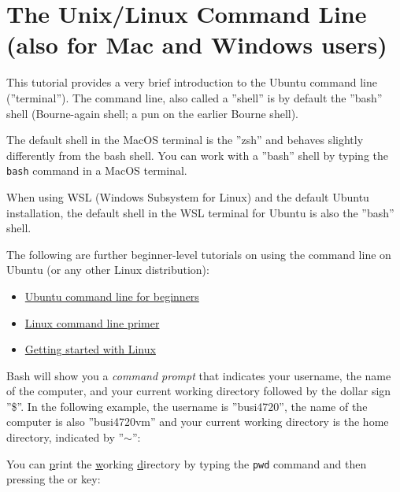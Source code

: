 
\section{The Unix/Linux Command Line (also for Mac and Windows users)}

This tutorial provides a very brief introduction to the Ubuntu command line (''terminal''). The command line, also called a ''shell'' is by default the ''bash'' shell (Bourne-again shell; a pun on the earlier Bourne shell). 

\begin{infobox} The default shell in the MacOS terminal is the ''zsh'' and behaves slightly differently from the bash shell. You can work with a ''bash'' shell by typing the \texttt{bash} command in a MacOS terminal.
\end{infobox}

\begin{infobox} When using WSL (Windows Subsystem for Linux) and the default Ubuntu installation, the default shell in the WSL terminal for Ubuntu is also the ''bash'' shell. 
\end{infobox}


\begin{resourcebox}
The following are further beginner-level tutorials on using the command line on Ubuntu (or any other Linux distribution):
\begin{itemize}
\item \href{https://ubuntu.com/tutorials/command-line-for-beginners}{Ubuntu command line for beginners}
\item \href{https://www.digitalocean.com/community/tutorials/a-linux-command-line-primer}{Linux command line primer}
\item \href{https://www.digitalocean.com/community/tutorial-series/getting-started-with-linux}{Getting started with Linux}
\end{itemize}
\end{resourcebox}

Bash will show you a \emph{command prompt} that indicates your username, the name of the computer, and your current working directory followed by the dollar sign ''\$''. In the following example, the username is ''busi4720'', the name of the computer is also ''busi4720vm'' and your current working directory is the home directory, indicated by ''$\sim$'':

You can \underline{p}rint the \underline{w}orking \underline{d}irectory by typing the \texttt{pwd} command and then pressing the  or  key:

